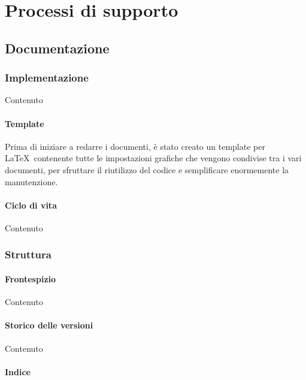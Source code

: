 
\section{Processi di supporto}\label{PS}

	\subsection{Documentazione}\label{PS:Documentazione}


		\subsubsection{Implementazione}\label{PS:Documentazione:Implementazione}
		Contenuto

			\paragraph{Template}\label{PS:Documentazione:Implementazione:Template}
			Prima di iniziare a redarre i documenti, è stato creato un template per \LaTeX \
			contenente tutte le impostazioni grafiche che vengono condivise tra i vari documenti, per sfruttare il riutilizzo
			del codice e semplificare enormemente la manutenzione.

			\paragraph{Ciclo di vita}\label{PS:Documentazione:Implementazione:CicloVita}
			Contenuto

		\subsubsection{Struttura}\label{PS:Documentazione:Struttura}

			\paragraph{Frontespizio}\label{PS:Documentazione:Struttura:Frontespizio}
			Contenuto

			\paragraph{Storico delle versioni}\label{PS:Documentazione:Struttura:StoricoVersioni}
			Contenuto

			\paragraph{Indice}\label{PS:Documentazione:Struttura:Indice}

